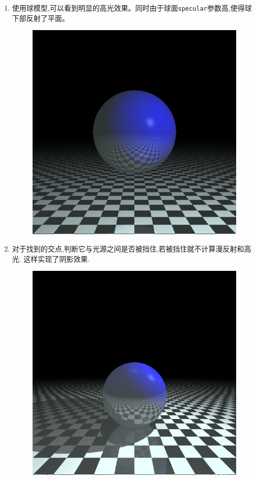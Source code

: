 \begin{enumerate}
\item

  使用球模型,可以看到明显的高光效果。同时由于球面\verb|specular|参数高,使得球下部反射了平面。
\begin{figure}[H]
  \centering
  \includegraphics[scale=0.4]{img/ball.png}
  \caption*{\label{fig:ball}}
\end{figure}

\item
  对于找到的交点,判断它与光源之间是否被挡住,若被挡住就不计算漫反射和高光. 这样实现了阴影效果.
\begin{figure}[H]
  \centering
  \includegraphics[scale=0.4]{img/shadow.png}
  \caption*{\label{fig:shadow}}
\end{figure}


\end{enumerate}

